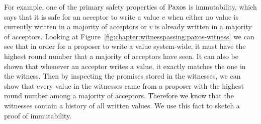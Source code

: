 For example, one of the primary safety properties of $\mathrm{Paxos}$ is immutability, which says that it
is safe for an acceptor to write a value $v$ when either no value is currently written in a
majority of acceptors or $v$ is already written in a majority of acceptors.
Looking at Figure~\ref{fig:chapter:witnesspassing:paxos-witness} we can see that in order for a proposer to write a value system-wide,
it must have the highest round number that a majority of acceptors have seen.
It can also be shown that whenever an acceptor writes a value, it exactly matches the one in the witness.
Then by inspecting the promises stored in the witnesses, we can show that every value in the witnesses
came from a proposer with the highest round number among a majority of acceptors.
Therefore we know that the witnesses contain a history of all written values.
We use this fact to sketch a proof of immutability.
%

